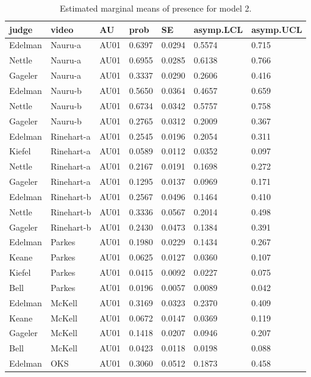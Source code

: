 \documentclass{monashthesis}
\begin{document}
\begin{center}
\begin{longtable}{lllllll}
\caption{\label{tab:result-2}Estimated marginal means of presence for model 2. }\\
\toprule
judge & video & AU & prob & SE & asymp.LCL & asymp.UCL \\
\midrule
\endhead
\bottomrule
\endfoot
Edelman & Nauru-a & AU01 & 0.6397 & 0.0294 & 0.5574 & 0.715 \\
Nettle & Nauru-a & AU01 & 0.6955 & 0.0285 & 0.6138 & 0.766 \\
Gageler & Nauru-a & AU01 & 0.3337 & 0.0290 & 0.2606 & 0.416 \\
Edelman & Nauru-b & AU01 & 0.5650 & 0.0364 & 0.4657 & 0.659 \\
Nettle & Nauru-b & AU01 & 0.6734 & 0.0342 & 0.5757 & 0.758 \\
Gageler & Nauru-b & AU01 & 0.2765 & 0.0312 & 0.2009 & 0.367 \\
Edelman & Rinehart-a & AU01 & 0.2545 & 0.0196 & 0.2054 & 0.311 \\
Kiefel & Rinehart-a & AU01 & 0.0589 & 0.0112 & 0.0352 & 0.097 \\
Nettle & Rinehart-a & AU01 & 0.2167 & 0.0191 & 0.1698 & 0.272 \\
Gageler & Rinehart-a & AU01 & 0.1295 & 0.0137 & 0.0969 & 0.171 \\
Edelman & Rinehart-b & AU01 & 0.2567 & 0.0496 & 0.1464 & 0.410 \\
Nettle & Rinehart-b & AU01 & 0.3336 & 0.0567 & 0.2014 & 0.498 \\
Gageler & Rinehart-b & AU01 & 0.2430 & 0.0473 & 0.1384 & 0.391 \\
Edelman & Parkes & AU01 & 0.1980 & 0.0229 & 0.1434 & 0.267 \\
Keane & Parkes & AU01 & 0.0625 & 0.0127 & 0.0360 & 0.107 \\
Kiefel & Parkes & AU01 & 0.0415 & 0.0092 & 0.0227 & 0.075 \\
Bell & Parkes & AU01 & 0.0196 & 0.0057 & 0.0089 & 0.042 \\
Edelman & McKell & AU01 & 0.3169 & 0.0323 & 0.2370 & 0.409 \\
Keane & McKell & AU01 & 0.0672 & 0.0147 & 0.0369 & 0.119 \\
Gageler & McKell & AU01 & 0.1418 & 0.0207 & 0.0946 & 0.207 \\
Bell & McKell & AU01 & 0.0423 & 0.0118 & 0.0198 & 0.088 \\
Edelman & OKS & AU01 & 0.3060 & 0.0512 & 0.1873 & 0.458 \\

\end{longtable}
\end{center}
\end{document}
